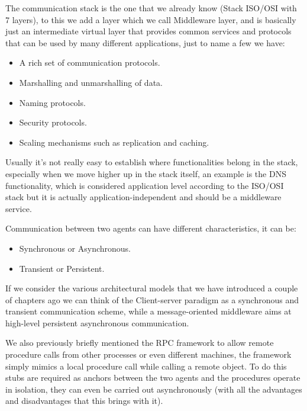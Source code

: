 The communication stack is the one that we already know (Stack ISO/OSI with 7 layers), to this we add a layer which we call Middleware layer, and is basically just an intermediate virtual layer that provides common services and protocols that can be used by many different applications, just to name a few we have:
\begin{itemize}
    \item A rich set of communication protocols.
    \item Marshalling and unmarshalling of data.
    \item Naming protocols.
    \item Security protocols.
    \item Scaling mechanisms such as replication and caching.
\end{itemize}
Usually it's not really easy to establish where functionalities belong in the stack, especially when we move higher up in the stack itself, an example is the DNS functionality, which is considered application level according to the ISO/OSI stack but it is actually application-independent and should be a middleware service.

Communication between two agents can have different characteristics, it can be:
\begin{itemize}
    \item Synchronous or Asynchronous.
    \item Transient or Persistent.
\end{itemize}
If we consider the various architectural models that we have introduced a couple of chapters ago we can think of the Client-server paradigm as a synchronous and transient communication scheme, while a message-oriented middleware aims at high-level persistent asynchronous communication.

We also previously briefly mentioned the RPC framework to allow remote procedure calls from other processes or even different machines, the framework simply mimics a local procedure call while calling a remote object. To do this stubs are required as anchors between the two agents and the procedures operate in isolation, they can even be carried out asynchronously (with all the advantages and disadvantages that this brings with it).


